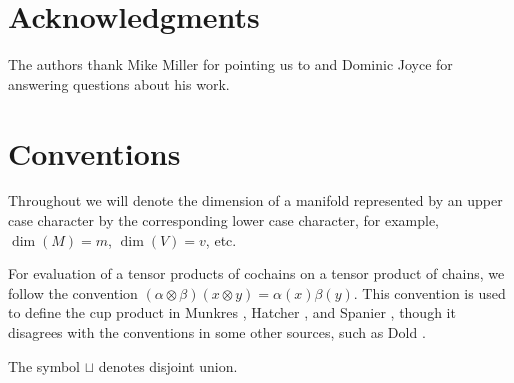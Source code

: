 \section*{Acknowledgments}

The authors thank Mike Miller for pointing us to \cite{Lipy14} and Dominic Joyce for answering questions about his work.

\section*{Conventions}

Throughout we will denote the dimension of a manifold represented by an upper case character by the corresponding lower case character, for example, $\dim(M) = m$, $\dim(V) = v$, etc.

For evaluation of a tensor products of cochains on a tensor product of chains, we follow the convention  $(\alpha \otimes \beta)(x\otimes y) = \alpha(x)\beta(y)$.
This convention is used to define the cup product in Munkres \cite[Section 60]{Mun84}, Hatcher \cite[Section 3.2]{Hatc02}, and Spanier \cite[Section 5.6]{Span81}, though it disagrees with the conventions in some other sources, such as Dold \cite[Section VII.7]{Dol72}.

The symbol $\sqcup$ denotes disjoint union.
